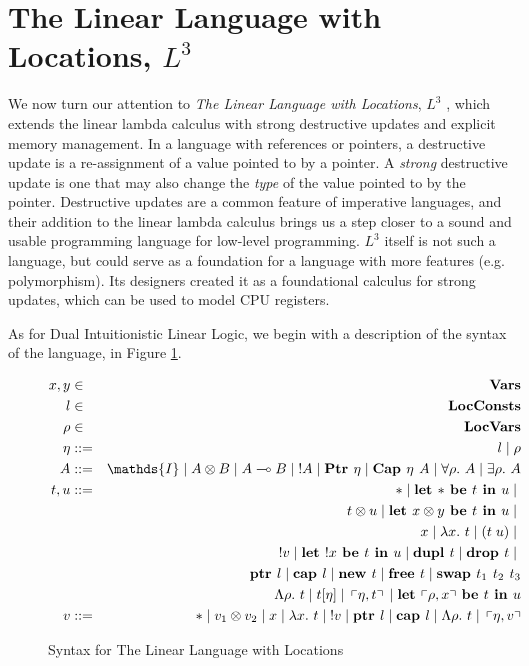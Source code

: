 \documentclass[]{unswthesis}
\newcommand{\Forall}[1]{\forall #1 \ldotp \,}
\newcommand{\Exists}[1]{\exists #1 \ldotp \,}
\newcommand{\lam}[1]{\lambda #1 \ldotp \,}
\newcommand{\Lam}[1]{\Lambda #1 \ldotp \,}
\newcommand{\app}[2]{(#1 \; #2)}
\newcommand{\lolly}{\multimap}
\newcommand{\letbe}[3]{\textbf{let $#1$ be $#2$ in $#3$}}
\newcommand{\sor}{\; | \;}
\newcommand{\Ptr}[1]{\textbf{Ptr $#1$}}
\newcommand{\ptr}[1]{\textbf{ptr $#1$}}
\newcommand{\Capa}[2]{\textbf{Cap $#1$ $#2$}}
\newcommand{\capa}[1]{\textbf{cap $#1$}}
\newcommand{\lquine}{\left\ulcorner}
\newcommand{\rquine}{\right\urcorner}
\newcommand{\dupl}[1]{\textbf{dupl $#1$}}
\newcommand{\drop}[1]{\textbf{drop $#1$}}
\newcommand{\lnew}[1]{\textbf{new $#1$}}
\newcommand{\lfree}[1]{\textbf{free $#1$}}
\newcommand{\lswap}[3]{\textbf{swap $#1$ $#2$ $#3$}}
\newcommand{\qpair}[2]{\lquine #1, #2 \rquine}
\let\i\textit
\let\b\textbf
\begin{document}
\section{The Linear Language with Locations, $L^3$}

We now turn our attention to \i{The Linear Language with Locations}, $L^3$ \cite{ahmed05}, which extends the linear lambda calculus with strong destructive updates and explicit memory management. In a language with references or pointers, a destructive update is a re-assignment of a value pointed to by a pointer. A \i{strong} destructive update is one that may also change the \i{type} of the value pointed to by the pointer. Destructive updates are a common feature of imperative languages, and their addition to the linear lambda calculus brings us a step closer to a sound and usable programming language for low-level programming. $L^3$ itself is not such a language, but could serve as a foundation for a language with more features (e.g. polymorphism). Its designers created it as a foundational calculus for strong updates, which can be used to model CPU registers.


As for Dual Intuitionistic Linear Logic, we begin with a description of the syntax of the language, in Figure \ref{l3_syntax}.

\begin{figure}[h]
\caption{Syntax for The Linear Language with Locations}
\label{l3_syntax}
\begin{eqnarray*}
x,y & \in & \b{Vars} \\
l & \in & \b{LocConsts} \\
\rho & \in & \b{LocVars} \\
\eta & ::= & l \sor \rho \\
A & ::= & \mathds{I} \sor A \otimes B \sor A \lolly B \sor !A \sor \Ptr{\eta} \sor \Capa{\eta}{A} \sor
\Forall{\rho} A \sor \Exists{\rho} A \\
t,u & ::= & * \sor \letbe{*}{t}{u} \sor \\
  && t \otimes u \sor \letbe{x \otimes y}{t}{u} \sor \\
  && x \sor \lam{x} t \sor \app{t}{u} \sor \\
  && {!v} \sor \letbe{!x}{t}{u} \sor \dupl{t} \sor \drop{t} \sor \\
  && \ptr{l} \sor \capa{l} \sor \lnew{t} \sor \lfree{t} \sor \lswap{t_1}{t_2}{t_3} \\
  && \Lam{\rho} t \sor t [\eta] \sor \qpair{\eta}{t} \sor \letbe{\qpair{\rho}{x}}{t}{u} \\
v & ::= & * \sor v_1 \otimes v_2 \sor x \sor \lam{x} t \sor {!v} \sor \ptr{l} \sor \capa{l}
  \sor \Lam{\rho} t \sor \qpair{\eta}{v}
\end{eqnarray*}
\end{figure}
\end{document}
